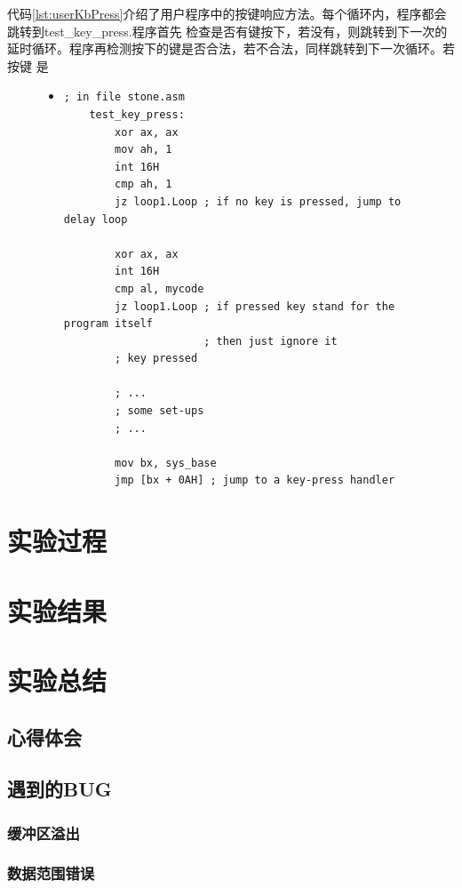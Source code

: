 \documentclass[a4paper]{article}
\begin{document}
    代码\ref{lst:userKbPress}介绍了用户程序中的按键响应方法。每个循环内，程序都会跳转到test_key_press.程序首先
    检查是否有键按下，若没有，则跳转到下一次的延时循环。程序再检测按下的键是否合法，若不合法，同样跳转到下一次循环。若按键
    是
    
    \begin{figure}
    \begin{itemize}
    \item[] \begin{lstlisting}[language={x86masm[Assembler]}, label=lst:userKbPress, caption=用户程序中对键盘按下的响应]
    ; in file stone.asm
    test_key_press:
        xor ax, ax
        mov ah, 1
        int 16H
        cmp ah, 1
        jz loop1.Loop ; if no key is pressed, jump to delay loop

        xor ax, ax
        int 16H
        cmp al, mycode
        jz loop1.Loop ; if pressed key stand for the program itself
                      ; then just ignore it
        ; key pressed

        ; ...
        ; some set-ups
        ; ...

        mov bx, sys_base
        jmp [bx + 0AH] ; jump to a key-press handler
    \end{lstlisting}
    \end{itemize}
    \end{figure}
\section{实验过程}
    \lipsum[1]
\section{实验结果}
    \lipsum[1]
\section{实验总结}
    \subsection{心得体会}
    \lipsum[1]
    \subsection{遇到的BUG}
        \subsubsection{缓冲区溢出}
        \subsubsection{数据范围错误}
\end{document}
